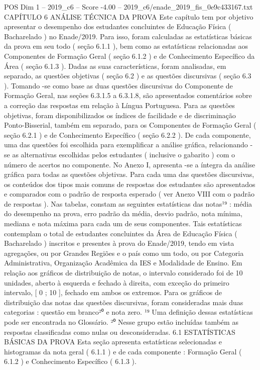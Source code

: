 \begin{textsample}{POS Dim 1 – 2019\_c6 – Score -4.00 – 2019\_c6/enade\_2019\_fis\_0e9c433167.txt}  \label{ex:f1_pos_358}
CAPÍTULO 6 ANÁLISE TÉCNICA DA PROVA Este capítulo tem por objetivo apresentar o desempenho dos estudantes concluintes de Educação Física ( Bacharelado ) no Enade/2019.
Para isso, foram calculadas as estatísticas básicas da prova em seu todo ( seção 6.1.1 ), bem como as estatísticas relacionadas aos Componentes de Formação Geral ( seção 6.1.2 ) e de Conhecimento Específico da Área ( seção 6.1.3 ).
Dadas as suas características, foram analisadas, em separado, as questões objetivas ( seção 6.2 ) e as questões discursivas ( seção 6.3 ).
Tomando -se como base as duas questões discursivas do Componente de Formação Geral, nas seções 6.3.1.5 a 6.3.1.8, são apresentados comentários sobre a correção das respostas em relação à Língua Portuguesa.
Para as questões objetivas, foram disponibilizados os índices de facilidade e de discriminação Ponto-Bisserial, também em separado, para os Componentes de Formação Geral ( seção 6.2.1 ) e de Conhecimento Específico ( seção 6.2.2 ).
De cada componente, uma das questões foi escolhida para exemplificar a análise gráfica, relacionando -se as alternativas escolhidas pelos estudantes ( inclusive o gabarito ) com o número de acertos no componente.
No Anexo I, apresenta -se a íntegra da análise gráfica para todas as questões objetivas.
Para cada uma das questões discursivas, os conteúdos dos tipos mais comuns de respostas dos estudantes são apresentados e comparados com o padrão de resposta esperado ( ver Anexo VIII com o padrão de respostas ).
Nas tabelas, constam as seguintes estatísticas das notas¹⁹ : média do desempenho na prova, erro padrão da média, desvio padrão, nota mínima, mediana e nota máxima para cada um de seus componentes.
Tais estatísticas contemplam o total de estudantes concluintes da Área de Educação Física ( Bacharelado ) inscritos e presentes à prova do Enade/2019, tendo em vista agregações, ou por Grandes Regiões e o país como um todo, ou por Categoria Administrativa, Organização Acadêmica da IES e Modalidade de Ensino.
Em relação aos gráficos de distribuição de notas, o intervalo considerado foi de 10 unidades, aberto à esquerda e fechado à direita, com exceção do primeiro intervalo, [ 0 ; 10 ], fechado em ambos os extremos.
Para os gráficos de distribuição das notas das questões discursivas, foram consideradas mais duas categorias : questão em branco²⁰ e nota zero. ¹⁹ Uma definição dessas estatísticas pode ser encontrada no Glossário. ²⁰ Nesse grupo estão incluídas também as respostas classificadas como nulas ou desconsideradas. 6.1 ESTATÍSTICAS BÁSICAS DA PROVA Esta seção apresenta estatísticas selecionadas e histogramas da nota geral ( 6.1.1 ) e de cada componente : Formação Geral ( 6.1.2 ) e Conhecimento Específico ( 6.1.3 ).

\end{textsample}
